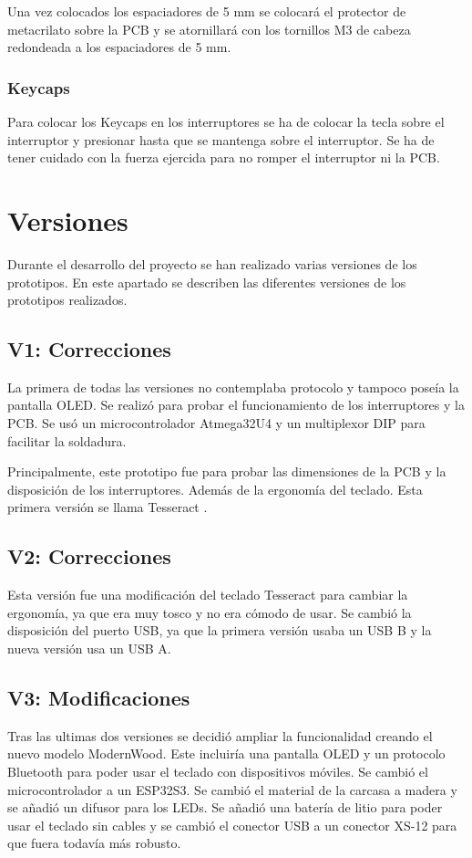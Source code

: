 Una vez colocados los espaciadores de 5 mm se colocará el protector de metacrilato sobre la \gls{PCB} y se atornillará con los tornillos M3 de cabeza redondeada a los espaciadores de 5 mm.

\subsubsection{\gls{Keycaps}}
Para colocar los \gls{Keycaps} en los interruptores se ha de colocar la tecla sobre el interruptor y presionar hasta que se mantenga sobre el interruptor. Se ha de tener cuidado con la fuerza ejercida para no romper el interruptor ni la \gls{PCB}.

\section{Versiones}
Durante el desarrollo del proyecto se han realizado varias versiones de los prototipos. En este apartado se describen las diferentes versiones de los prototipos realizados.

\subsection{V1: Correcciones}
La primera de todas las versiones no contemplaba protocolo  y tampoco poseía la pantalla \gls{OLED}. Se realizó para probar el funcionamiento de los interruptores y la \gls{PCB}. Se usó un microcontrolador Atmega32U4 y un multiplexor DIP para facilitar la soldadura.

Principalmente, este prototipo fue para probar las dimensiones de la \gls{PCB} y la disposición de los interruptores. Además de la ergonomía del teclado. Esta primera versión se llama Tesseract \cite{Tesseract}.

\subsection{V2: Correcciones}
Esta versión fue una modificación del teclado Tesseract \cite{Tesseract} para cambiar la ergonomía, ya que era muy tosco y no era cómodo de usar. Se cambió la disposición del puerto \gls{USB}, ya que la primera versión usaba un \gls{USB} B y la nueva versión usa un \gls{USB} A.

\subsection{V3: Modificaciones}
Tras las ultimas dos versiones se decidió ampliar la funcionalidad creando el nuevo modelo ModernWood. Este incluiría una pantalla \gls{OLED} y un protocolo \gls{Bluetooth} para poder usar el teclado con dispositivos móviles. Se cambió el microcontrolador a un ESP32S3. Se cambió el material de la carcasa a madera y se añadió un difusor para los \gls{LED}s. Se añadió una batería de litio para poder usar el teclado sin cables y se cambió el conector \gls{USB} a un conector XS-12 para que fuera todavía más robusto.